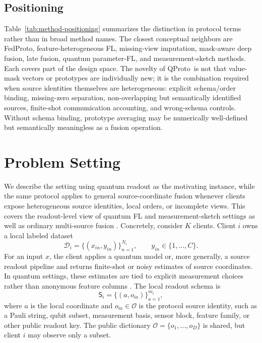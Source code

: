 \documentclass[preprint]{elsarticle}
\newcommand{\method}{QProto}
\newcommand{\schema}{\mathsf{S}}
\newcommand{\cD}{\mathcal{D}}
\newcommand{\cO}{\mathcal{O}}
\begin{document}

\subsection{Positioning}

Table~\ref{tab:method-positioning} summarizes the distinction in protocol terms rather than in broad method names. The closest conceptual neighbors are FedProto, feature-heterogeneous FL, missing-view imputation, mask-aware deep fusion, late fusion, quantum parameter-FL, and measurement-sketch methods. Each covers part of the design space. The novelty of \method\ is not that value-mask vectors or prototypes are individually new; it is the combination required when source identities themselves are heterogeneous: explicit schema/order binding, missing-zero separation, non-overlapping but semantically identified sources, finite-shot communication accounting, and wrong-schema controls. Without schema binding, prototype averaging may be numerically well-defined but semantically meaningless as a fusion operation.

\section{Problem Setting}

We describe the setting using quantum readout as the motivating instance, while the same protocol applies to general source-coordinate fusion whenever clients expose heterogeneous source identities, local orders, or incomplete views. This covers the readout-level view of quantum FL and measurement-sketch settings as well as ordinary multi-source fusion \cite{ren2025towardqfl,huang2020classicalshadows,hadfield2022locallybiased,castanedo2013datafusion}. Concretely, consider \(K\) clients. Client \(i\) owns a local labeled dataset
\begin{equation}
    \cD_i=\{(x_{in},y_{in})\}_{n=1}^{N_i}, \qquad y_{in}\in\{1,\ldots,C\}.
\end{equation}
For an input \(x\), the client applies a quantum model or, more generally, a source readout pipeline and returns finite-shot or noisy estimates of source coordinates. In quantum settings, these estimates are tied to explicit measurement choices rather than anonymous feature columns \cite{havlicek2019supervised,schuld2019feature,huang2020classicalshadows}. The local readout schema is
\begin{equation}
    \schema_i = \{(a,o_{ia})\}_{a=1}^{m_i},
\end{equation}
where \(a\) is the local coordinate and \(o_{ia}\in\cO\) is the protocol source identity, such as a Pauli string, qubit subset, measurement basis, sensor block, feature family, or other public readout key. The public dictionary \(\cO=\{o_1,\ldots,o_D\}\) is shared, but client \(i\) may observe only a subset.
\end{document}
